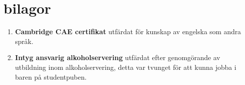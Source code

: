 \documentclass[]{friggeri-cv} %
\begin{document}

\section{bilagor}
\begin{enumerate}
	\item \textbf{Cambridge CAE certifikat} utfärdat för kunskap av engelska som andra språk.
	\item \textbf{Intyg ansvarig alkoholservering} utfärdat efter genomgörande av utbildning inom alkoholservering, detta var tvunget för att kunna jobba i baren på studentpuben.
\end{enumerate}
\newpage
\appendix



\end{document}
